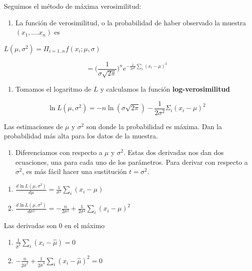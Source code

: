 \documentclass[
]{book}
\providecommand{\tightlist}{%
  \setlength{\itemsep}{0pt}\setlength{\parskip}{0pt}}
\begin{document}
Seguimos el método de máxima verosimilitud:

\begin{enumerate}
\def\labelenumi{\arabic{enumi}.}
\tightlist
\item
  La función de verosimilitud, o la probabilidad de haber observado la muestra \((x_1, ....x_n)\) es
\end{enumerate}

\(L(\mu, \sigma^2)=\Pi_{i=1..n} f(x_i;\mu,\sigma)\)

\[=\big( \frac{1}{\sigma \sqrt{2 \pi}}\big)^ne^{-\frac{1}{2\sigma^2} \sum_i(x_i-\mu) ^2}\]

\begin{enumerate}
\def\labelenumi{\arabic{enumi}.}
\setcounter{enumi}{1}
\tightlist
\item
  Tomamos el logaritmo de \(L\) y calculamos la función \textbf{log-verosimilitud}
\end{enumerate}

\[\ln L(\mu, \sigma^2)=-n \ln(\sigma \sqrt{2 \pi})-\frac{1}{2\sigma^2} \Sigma_i(x_i-\mu )^2\]

Las estimaciones de \(\mu\) y \(\sigma^2\) son donde la probabilidad es máxima. Dan la probabilidad más alta para los datos de la muestra.

\begin{enumerate}
\def\labelenumi{\arabic{enumi}.}
\setcounter{enumi}{2}
\tightlist
\item
  Diferenciamos con respecto a \(\mu\) y \(\sigma^2\). Estas dos derivadas nos dan dos ecuaciones, una para cada uno de los parámetros. Para derivar con respecto a \(\sigma^2\), es más fácil hacer una sustitución \(t=\sigma^2\).
\end{enumerate}

\begin{enumerate}
\def\labelenumi{\alph{enumi})}
\item
  \(\frac{d \ln L(\mu, \sigma^2)}{d\mu}=\frac{1}{\sigma^2} \sum_i(x_i-\mu)\)
\item
  \(\frac{d \ln L(\mu, \sigma^2)}{d\sigma^2}=-\frac{n}{2 \sigma^2}+\frac{1}{2\sigma^4} \sum_i(x_i-\mu)^2\)
\end{enumerate}

Las derivadas son \(0\) en el máximo

\begin{enumerate}
\def\labelenumi{\alph{enumi})}
\tightlist
\item
  \(\frac{1}{\hat{\sigma}^2} \sum_i(x_i-\hat{\mu})=0\)
\item
  \(-\frac{n}{2 \hat{\sigma}^2}+\frac{1}{2\hat{\sigma}^4} \sum_i(x_i-\hat{\mu})^ 2=0\)
\end{enumerate}
\end{document}
